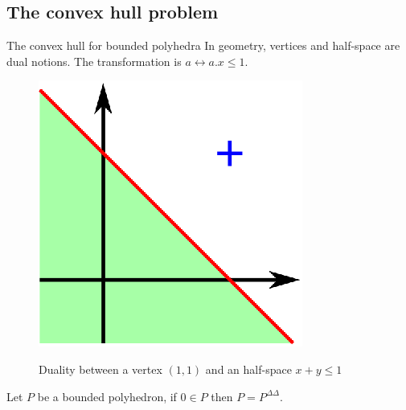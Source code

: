 \subsection{The convex hull problem}
\begin{frame}{The convex hull for bounded polyhedra}
In geometry, vertices and half-space are dual notions. The transformation is $a \leftrightarrow a.x \leq 1 $.
\begin{figure}
\includegraphics[scale=0.7]{images/dual.eps}

Duality between a vertex $(1,1)$ and an half-space $x+y \leq 1$
\end{figure}

\vspace*{-0.5cm}

\begin{theorem}
Let $P$ be a bounded polyhedron, if $0\in P$ then $P=P^{\Delta\Delta}$.
\end{theorem}

\end{frame}

